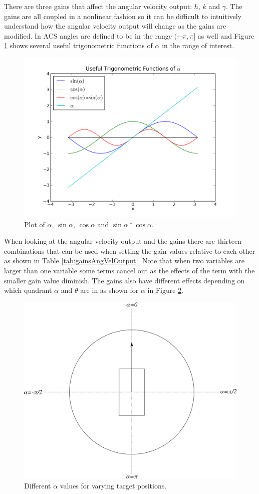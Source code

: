\documentclass[12pt]{article}
\begin{document}
There are three gains that affect the angular velocity output: $h$, $k$ and $\gamma$. The gains are all coupled in a nonlinear fashion so it can be difficult to intuitively understand how the angular velocity output will change as the gains are modified. In ACS angles are defined to be in the range $(-\pi,\pi]$ as well and Figure \ref{fig:plotSinCos} shows several useful trigonometric functions of $\alpha$ in the range of interest.

\begin{figure}[ht!]
	\centering
	\includegraphics[width=.75\textwidth]{images/plotSinCos}
	\caption{Plot of $\alpha$, $\sin\alpha$, $\cos\alpha$ and $\sin\alpha*\cos\alpha$.}
	\label{fig:plotSinCos}
\end{figure}

When looking at the angular velocity output and the gains there are thirteen combinations that can be used when setting the gain values relative to each other as shown in Table \ref{tab:gainsAngVelOutput}. Note that when two variables are larger than one variable some terms cancel out as the effects of the term with the smaller gain value diminish. The gains also have different effects depending on which quadrant $\alpha$ and $\theta$ are in as shown for $\alpha$ in Figure \ref{fig:robotAlpha}.

\begin{figure}[ht!]
	\centering
	\includegraphics[width=.3\textwidth]{images/robotAlpha}
	\caption{Different $\alpha$ values for varying target positions.}
	\label{fig:robotAlpha}
\end{figure}
\end{document}

